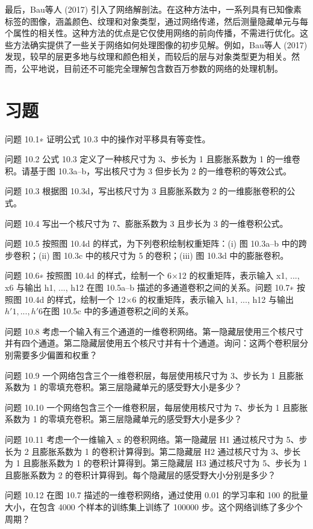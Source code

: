 最后，Bau等人 (2017) 引入了网络解剖法。在这种方法中，一系列具有已知像素标签的图像，涵盖颜色、纹理和对象类型，通过网络传递，然后测量隐藏单元与每个属性的相关性。这种方法的优点是它仅使用网络的前向传播，不需进行优化。这些方法确实提供了一些关于网络如何处理图像的初步见解。例如，Bau等人 (2017) 发现，较早的层更多地与纹理和颜色相关，而较后的层与对象类型更为相关。然而，公平地说，目前还不可能完全理解包含数百万参数的网络的处理机制。
\section{习题}  
问题 10.1∗ 证明公式 10.3 中的操作对平移具有等变性。

问题 10.2 公式 10.3 定义了一种核尺寸为 3、步长为 1 且膨胀系数为 1 的一维卷积。请基于图 10.3a–b，写出核尺寸为 3 但步长为 2 的一维卷积的等效公式。

问题 10.3 根据图 10.3d，写出核尺寸为 3 且膨胀系数为 2 的一维膨胀卷积的公式。

问题 10.4 写出一个核尺寸为 7、膨胀系数为 3 且步长为 3 的一维卷积公式。

问题 10.5 按照图 10.4d 的样式，为下列卷积绘制权重矩阵：(i) 图 10.3a–b 中的跨步卷积；(ii) 图 10.3c 中的核尺寸为 5 的卷积；(iii) 图 10.3d 中的膨胀卷积。

问题 10.6∗ 按照图 10.4d 的样式，绘制一个 6×12 的权重矩阵，表示输入 x1, ..., x6 与输出 h1, ..., h12 在图 10.5a–b 描述的多通道卷积之间的关系。问题 10.7∗ 按照图 10.4d 的样式，绘制一个 12×6 的权重矩阵，表示输入 h1, ..., h12 与输出 \(h \prime 1,...,h \prime 6 \)在图 10.5c 中的多通道卷积之间的关系。

问题 10.8 考虑一个输入有三个通道的一维卷积网络。第一隐藏层使用三个核尺寸并有四个通道。第二隐藏层使用五个核尺寸并有十个通道。询问：这两个卷积层分别需要多少偏置和权重？

问题 10.9 一个网络包含三个一维卷积层，每层使用核尺寸为 3、步长为 1 且膨胀系数为 1 的零填充卷积。第三层隐藏单元的感受野大小是多少？

问题 10.10 一个网络包含三个一维卷积层，每层使用核尺寸为 7、步长为 1 且膨胀系数为 1 的零填充卷积。第三层隐藏单元的感受野大小是多少？

问题 10.11 考虑一个一维输入 x 的卷积网络。第一隐藏层 H1 通过核尺寸为 5、步长为 2 且膨胀系数为 1 的卷积计算得到。第二隐藏层 H2 通过核尺寸为 3、步长为 1 且膨胀系数为 1 的卷积计算得到。第三隐藏层 H3 通过核尺寸为 5、步长为 1 且膨胀系数为 2 的卷积计算得到。每个隐藏层的感受野大小分别是多少？

问题 10.12 在图 10.7 描述的一维卷积网络，通过使用 0.01 的学习率和 100 的批量大小，在包含 4000 个样本的训练集上训练了 100000 步。这个网络训练了多少个周期？

